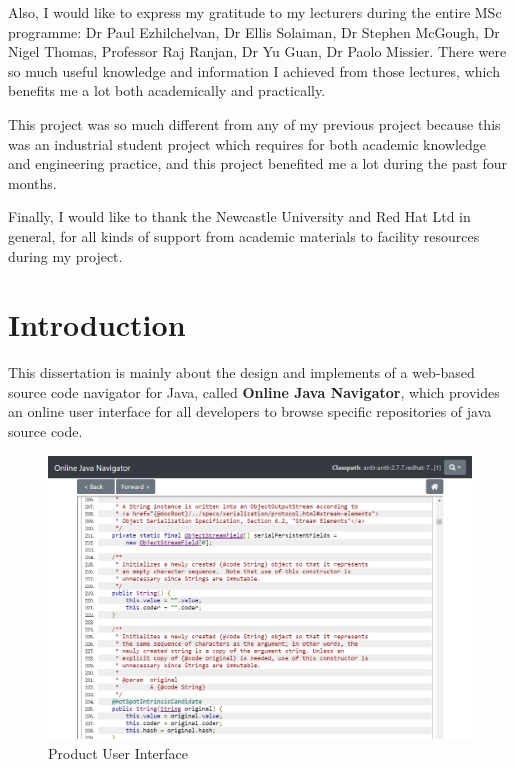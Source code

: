 \documentclass[runningheads]{llncs}
\begin{document}
Also, I would like to express my gratitude to my lecturers during the entire MSc programme: Dr Paul Ezhilchelvan, Dr Ellis Solaiman, Dr Stephen McGough,  Dr Nigel Thomas,  Professor Raj Ranjan,  Dr Yu Guan, Dr Paolo Missier. There were so much useful knowledge and information I achieved from those lectures, which benefits me a lot both academically and practically.

This project was so much different from any of my previous project because this was an industrial student project which requires for both academic knowledge and engineering practice, and this project benefited me a lot during the past four months.

Finally, I would like to thank the Newcastle University and Red Hat Ltd in general, for all kinds of support from academic materials to facility resources during my project.


\newpage
\tableofcontents

\newpage
{}
\setcounter{page}{1}
\section{Introduction}

This dissertation is mainly about the design and implements of a web-based source code navigator for Java, called \textbf{Online Java Navigator}\cite{ojn-Repository}, which provides an online user interface for all developers to browse specific repositories of java source code.

\begin{figure}[H]
	\centering
	\includegraphics[width=12cm]{pic/OJNWebPage.png}
	\caption{Product User Interface}
	\label{product user interface}
\end{figure}
\end{document}
